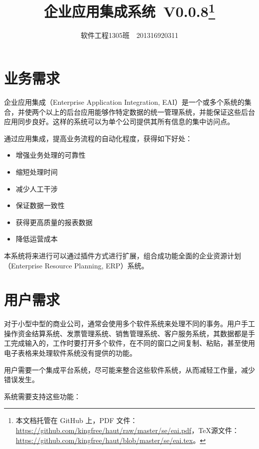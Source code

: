 \documentclass[cs4size,a4paper,nofonts]{ctexart}
\def\tjf{{\tt{田劲锋}}}
\def\titlec{企业应用集成系统}
\def\version{V0.0.8}
\begin{document}

\title{\bf\titlec~\version\footnote{本文档托管在 GitHub 上，PDF 文件：\url{https://github.com/kingfree/haut/raw/master/se/eai.pdf}，\TeX 源文件：\url{https://github.com/kingfree/haut/blob/master/se/eai.tex}。}}
\author{软件工程1305班~\quad\tjf\quad~201316920311}
\maketitle

\begin{multicols}{2}
\tableofcontents
\end{multicols}

\section{业务需求}

企业应用集成（Enterprise Application Integration, EAI）是一个或多个系统的集合，并使两个以上的后台应用能够作特定数据的统一管理系统，并能保证这些后台应用同步良好。这样的系统可以为单个公司提供其所有信息的集中访问点。

通过应用集成，提高业务流程的自动化程度，获得如下好处：

\begin{itemize}
\item 增强业务处理的可靠性
\item 缩短处理时间
\item 减少人工干涉
\item 保证数据一致性
\item 获得更高质量的报表数据
\item 降低运营成本
\end{itemize}

本系统将来进行可以通过插件方式进行扩展，组合成功能全面的企业资源计划（Enterprise Resource Planning, ERP）系统。

\section{用户需求}

对于小型中型的商业公司，通常会使用多个软件系统来处理不同的事务。用户手工操作资金结算系统、发票管理系统、销售管理系统、客户服务系统，其数据都是手工完成输入的，工作时要打开多个软件，在不同的窗口之间复制、粘贴，甚至使用电子表格来处理软件系统没有提供的功能。

用户需要一个集成平台系统，尽可能来整合这些软件系统，从而减轻工作量，减少错误发生。

系统需要支持这些功能：
\end{document}
